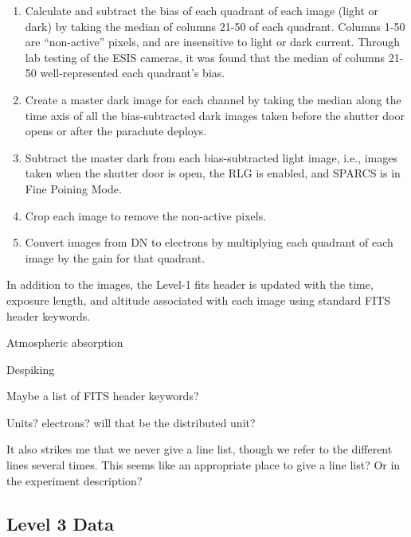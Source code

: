     	\begin{enumerate}
    	    \item Calculate and subtract the bias of each quadrant of each image (light or dark) by taking the median of columns 21-50 of each quadrant. Columns 1-50 are ``non-active'' pixels, and are insensitive to light or dark current. Through lab testing of the ESIS cameras, it was found that the median of columns 21-50 well-represented each quadrant's bias.  
    	    \item Create a master dark image for each channel by taking the median along the time axis of all the bias-subtracted dark images taken before the shutter door opens or after the parachute deploys.
    	    \item Subtract the master dark from each bias-subtracted light image, i.e., images taken when the shutter door is open, the RLG is enabled, and SPARCS is in Fine Poining Mode.
    	    \item Crop each image to remove the non-active pixels.
    	    \item Convert images from DN to electrons by multiplying each quadrant of each image by the gain for that quadrant.
    	\end{enumerate}
    	
	In addition to the images, the Level-1 fits header is updated with the time, exposure length, and altitude associated with each image using standard FITS header keywords. 
	
	Atmospheric absorption
	
	Despiking
	
	Maybe a list of FITS header keywords?  
	
	Units?  electrons?  will that be the distributed unit?
	
	It also strikes me that we never give a line list, though we refer to the different lines several times.  This seems like an appropriate place to give a line list?  Or in the experiment description?

    \subsection{Level 3 Data}
 
    
    	\newcommand{\vigfit}{[0.44, 0.34, 0.38, 0.5]}
    	\newcommand{\levthreetime}{2019-09-30T18:08:51.644}
    	
